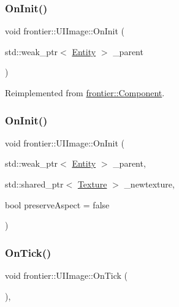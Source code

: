 \subsubsection{\texorpdfstring{On\+Init()}{OnInit()}\hspace{0.1cm}{\footnotesize\ttfamily [1/2]}}
{\footnotesize\ttfamily void frontier\+::\+U\+I\+Image\+::\+On\+Init (\begin{DoxyParamCaption}\item[{std\+::weak\+\_\+ptr$<$ \hyperlink{classfrontier_1_1_entity}{Entity} $>$}]{\+\_\+parent }\end{DoxyParamCaption})\hspace{0.3cm}{\ttfamily [virtual]}}



Reimplemented from \hyperlink{classfrontier_1_1_component_af3da02905c4d79219d9b12f260a35ad1}{frontier\+::\+Component}.

\mbox{\label{classfrontier_1_1_u_i_image_a77205b7ee247e0ee36523e07816e10fb}} 
\subsubsection{\texorpdfstring{On\+Init()}{OnInit()}\hspace{0.1cm}{\footnotesize\ttfamily [2/2]}}
{\footnotesize\ttfamily void frontier\+::\+U\+I\+Image\+::\+On\+Init (\begin{DoxyParamCaption}\item[{std\+::weak\+\_\+ptr$<$ \hyperlink{classfrontier_1_1_entity}{Entity} $>$}]{\+\_\+parent,  }\item[{std\+::shared\+\_\+ptr$<$ \hyperlink{classfrontier_1_1_texture}{Texture} $>$}]{\+\_\+newtexture,  }\item[{bool}]{preserve\+Aspect = {\ttfamily false} }\end{DoxyParamCaption})}

\mbox{\label{classfrontier_1_1_u_i_image_a4e0d055c0add55fa5e63ae892ea59498}} 
\subsubsection{\texorpdfstring{On\+Tick()}{OnTick()}}
{\footnotesize\ttfamily void frontier\+::\+U\+I\+Image\+::\+On\+Tick (\begin{DoxyParamCaption}{ }\end{DoxyParamCaption})\hspace{0.3cm}{\ttfamily [override]}, {\ttfamily [virtual]}}



